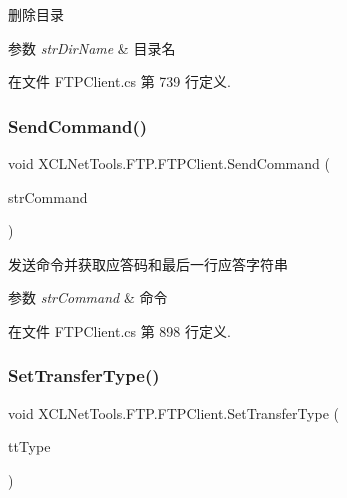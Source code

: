 删除目录 


\begin{DoxyParams}{参数}
{\em str\+Dir\+Name} & 目录名\\
\hline
\end{DoxyParams}


在文件 F\+T\+P\+Client.\+cs 第 739 行定义.

\mbox{\label{class_x_c_l_net_tools_1_1_f_t_p_1_1_f_t_p_client_af99f1f4bd038882ec30bdf4e89d73d4a}} 
\subsubsection{\texorpdfstring{Send\+Command()}{SendCommand()}}
{\footnotesize\ttfamily void X\+C\+L\+Net\+Tools.\+F\+T\+P.\+F\+T\+P\+Client.\+Send\+Command (\begin{DoxyParamCaption}\item[{String}]{str\+Command }\end{DoxyParamCaption})}



发送命令并获取应答码和最后一行应答字符串 


\begin{DoxyParams}{参数}
{\em str\+Command} & 命令\\
\hline
\end{DoxyParams}


在文件 F\+T\+P\+Client.\+cs 第 898 行定义.

\mbox{\label{class_x_c_l_net_tools_1_1_f_t_p_1_1_f_t_p_client_a34ec9858385eb10edb576ee871a0e02f}} 
\subsubsection{\texorpdfstring{Set\+Transfer\+Type()}{SetTransferType()}}
{\footnotesize\ttfamily void X\+C\+L\+Net\+Tools.\+F\+T\+P.\+F\+T\+P\+Client.\+Set\+Transfer\+Type (\begin{DoxyParamCaption}\item[{\hyperlink{class_x_c_l_net_tools_1_1_f_t_p_1_1_f_t_p_client_adef28404af1c916d9bd2bfbfa924b707}{Transfer\+Type}}]{tt\+Type }\end{DoxyParamCaption})}



